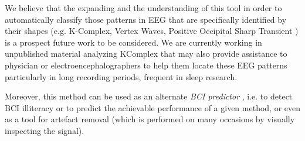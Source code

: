 \documentclass[entropy,article,submit,moreauthors,pdftex,10pt,a4paper]{mdpi}
\begin{document}
We believe that the expanding and the understanding of this tool in order to automatically classify those patterns in EEG that are specifically identified by their shapes (e.g. K-Complex, Vertex Waves, Positive Occipital Sharp Transient \citep{Hartman2005}) is a prospect future work to be considered. We are currently working in unpublished material analyzing KComplex that may also provide  assistance to physician or electroencephalographers to help them locate these EEG patterns particularly in long recording periods, frequent in sleep research.

Moreover, this method can be used as an alternate \textit{BCI predictor} \citep{Clerc}, i.e. to detect BCI illiteracy or to predict the achievable performance of a given method, or even as a tool for artefact removal (which is performed on many occasions by visually inspecting the signal).

%
%
%
%



\vspace{6pt} 


\end{document}
